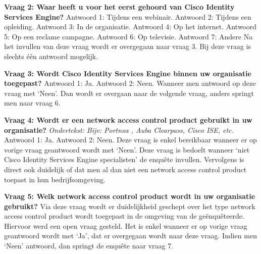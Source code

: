 \begin{itemize}
\textbf{Vraag 2: Waar heeft u voor het eerst gehoord van Cisco Identity Services Engine?}
\newline
Antwoord 1: Tijdens een webinair. \newline
Antwoord 2: Tijdens een opleiding. \newline
Antwoord 3: In de organisatie. \newline
Antwoord 4: Op het internet. \newline
Antwoord 5: Op een reclame campagne. \newline
Antwoord 6: Op televisie. \newline
Antwoord 7: Andere \newline \newline
Na het invullen van deze vraag wordt er overgegaan naar vraag 3. Bij deze vraag is slechts één antwoord mogelijk. 

\textbf{Vraag 3: Wordt Cisco Identity Services Engine binnen uw organisatie toegepast?}
\newline
Antwoord 1: Ja.\newline
Antwoord 2: Neen.\newline \newline
Wanneer men antwoord op deze vraag met ‘Neen’. Dan wordt er overgaan naar de volgende vraag, anders springt men naar vraag 6.

\textbf{Vraag 4: Wordt er een network access control product gebruikt in uw organisatie? }
\newline
\textit{Ondertekst: Bijv: Portnox , Auba Clearpass, Cisco ISE, etc. }\newline
Antwoord 1: Ja.\newline
Antwoord 2: Neen.\newline \newline
Deze vraag is enkel bereikbaar wanneer er op vorige vraag geantwoord wordt met ‘Neen’. Deze vraag is bedoelt wanneer ‘niet Cisco Identity Services Engine specialisten’ de enquête invullen. Vervolgens is direct ook duidelijk of dat men al dan niet een network access control product toepast in hun bedrijfsomgeving. 

\textbf{Vraag 5: Welk network access control product wordt in uw organisatie gebruikt?}
\newline
Via deze vraag wordt er duidelijkheid geschept over het type network access control product wordt toegepast in de omgeving van de geënquêteerde. Hiervoor werd een open vraag gesteld. Het is enkel wanneer er op vorige vraag geantwoord wordt met ‘Ja’, dat er overgegaan wordt naar deze vraag. Indien men ‘Neen’ antwoord, dan springt de enquête naar vraag 7. 


\end{itemize}

